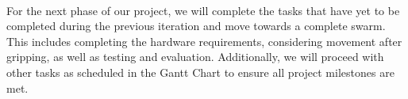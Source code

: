 \paragraph*{}
For the next phase of our project, we will complete the tasks that have yet to be completed during the previous iteration and move towards a complete swarm. This includes completing the hardware requirements, considering movement after gripping, as well as testing and evaluation. Additionally, we will proceed with other tasks as scheduled in the Gantt Chart to ensure all project milestones are met.
